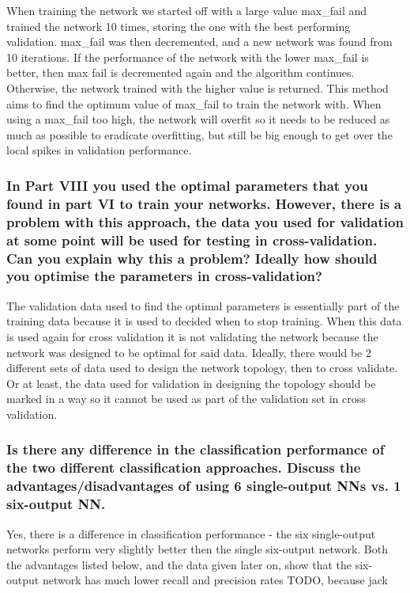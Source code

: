 \documentclass[12pt]{article}
\begin{document}
When training the network we started off with a large value max\_fail and trained the network 10 times, storing the one with the best performing validation. max\_fail was then decremented, and a new network was found from 10 iterations. If the performance of the network with the lower max\_fail is better, then max fail is decremented again and the algorithm continues. Otherwise, the network trained with the higher value is returned. This method aims to find the optimum value of max\_fail to train the network with. When using a max\_fail too high, the network will overfit so it needs to be reduced as much as possible to eradicate overfitting, but still be big enough to get over the local spikes in validation performance. 


\subsubsection*{In Part VIII you used the optimal parameters that you found in part VI to train your networks. However, there is a problem with this approach, the data you used for validation at some point will be used for testing in cross-validation. Can you explain why this a problem? Ideally how should you optimise the parameters in cross-validation?}

The validation data used to find the optimal parameters is essentially part of the training data because it is used to decided when to stop training. When this data is used again for cross validation it is not validating the network because the network was designed to be optimal for said data. Ideally, there would be 2 different sets of data used to design the network topology, then to cross validate. Or at least, the data used for validation in designing the topology should be marked in a way so it cannot be used as part of the validation set in cross validation.

\subsubsection*{Is there any difference in the classification performance of the two different classification approaches. Discuss the advantages/disadvantages of using 6 single-output NNs vs. 1 six-output NN.}

Yes, there is a difference in classification performance - the six single-output networks perform very slightly better then the single six-output network. Both the advantages listed below, and the data given later on, show that the six-output network has much lower recall and precision rates TODO, because jack
\end{document}
